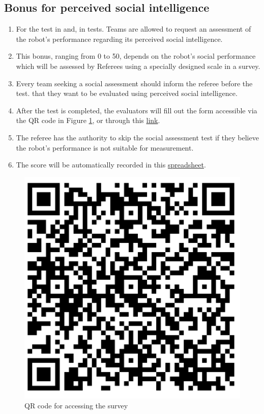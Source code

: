 \subsection{Bonus for perceived social intelligence}\label{rule:perceived_intelligence}
\begin{enumerate}	
    \item For the test  in  and,  in  tests. Teams are allowed to request an assessment of the robot's performance regarding its perceived social intelligence.
    
    \item This bonus, ranging from 0 to 50, depends on the robot's social performance which will be assessed by Referees using a specially designed scale in a survey.

    \item Every team seeking a social assessment should inform the referee before the test. that they want to be evaluated using perceived social intelligence.    
  
    \item After the test is completed, the evaluators will fill out the form accessible via the QR code in Figure \ref{fig:qr-survey}, or through this \href{https://forms.office.com/Pages/ResponsePage.aspx?id=6sSEXw03nkuDDHVvi_G1H7VNGCdGFtZJs0ryJVVWtCFUQVFSWDlYM0FHRVA2QllIT0tOQjI2QUcxQi4u}{link}.
    
    \item The referee has the authority to skip the social assessment test if they believe the robot's performance is not suitable for measurement.
    
    \item The score will be automatically recorded in this \href{https://urjc-my.sharepoint.com/:x:/r/personal/juan_pena_urjc_es/Documents/ROBOCUP%20@HOME%20PSI%20SCALE%20PROPOSAL.xlsx?d=wfdc816bee34742e1a9e5bea95677985d&csf=1&web=1&e=zRwl4u}{spreadsheet}.
\end{enumerate}

\begin{figure}[H]
    \centering    \includegraphics[width=0.3\linewidth]{images/QRCode for ROBOCUP @HOME PSI SCALE PROPOSAL(1).png}
    \caption{QR code for accessing the survey}
    \label{fig:qr-survey}
\end{figure}


